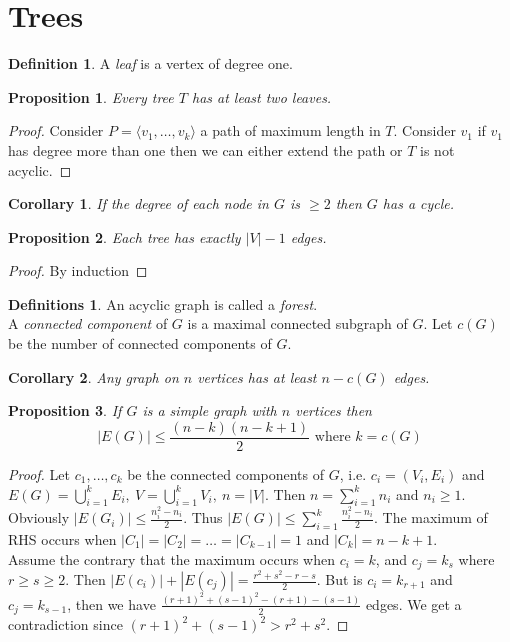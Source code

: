 \documentclass{article}
\newtheorem*{cor}{Corollary}
\newtheorem*{prop}{Proposition}
\theoremstyle{definition}
\newtheorem*{defn}{Definition}
\newtheorem*{defns}{Definitions}
\begin{document}
\section{Trees}

\begin{defn}
A \emph{leaf} is a vertex of degree one.
\end{defn}

\begin{prop}
Every tree $T$ has at least two leaves.
\end{prop}

\begin{proof}
Consider $P=\langle v_1,\ldots,v_k\rangle$ a path of maximum length in $T$.
Consider $v_1$ if $v_1$ has degree more than one then we can either extend the path or $T$ is not acyclic.
\end{proof}


\begin{cor}
If the degree of each node in $G$ is $\ge 2$ then $G$ has a cycle.
\end{cor}

\begin{prop}
Each tree has exactly $|V| -1$ edges.
\end{prop}

\begin{proof}
\lbrack By induction\rbrack
\end{proof}

\begin{defns}
An acyclic graph is called a \emph{forest}.\\
A \emph{connected component} of $G$ is a maximal connected subgraph of $G$.
Let $c(G)$ be the number of connected components of $G$. %
\end{defns}

\begin{cor}
Any graph on $n$ vertices has at least $n-c(G)$ edges.
\end{cor}

\begin{prop}
If $G$ is a simple graph with $n$ vertices then
$$|E(G)| \le \frac{(n-k)(n-k+1)}{2} \text{ where }k=c(G)$$
\end{prop}

\begin{proof}
Let $c_1,\ldots,c_k$ be the connected components of $G$, i.e. $c_i=(V_i,E_i)$ and $E(G) = \bigcup_{i=1}^k E_i,\ V=\bigcup_{i=1}^k V_i,\ n=|V|$.
Then $n=\sum_{i=1}^k n_i$ and $n_i \ge 1$.
Obviously $|E(G_i)| \le \frac{n_i^2 -n_i}{2}$.
Thus $|E(G)| \le \sum_{i=1}^k \frac{n_i^2-n_i}{2}$.
The maximum of RHS occurs when $|C_1| = |C_2| = \ldots = |C_{k-1}| = 1$ and $|C_k| = n-k +1$. \\
Assume the contrary that the maximum occurs when $c_i = k$, and $c_j = k_s$ where $r\ge s \ge 2$.
Then $|E(c_i)| + |E(c_j)| = \frac{r^2 + s^2 - r -s}{2}$.
But is $c_i = k_{r+1}$ and $c_j = k_{s-1}$, then we have $\frac{(r+1)^2 + (s-1)^2 - (r+1) -(s-1)}{2}$ edges.
We get a contradiction since $(r+1)^2 + (s-1)^2 > r^2 + s^2$.
\end{proof}
\end{document}
